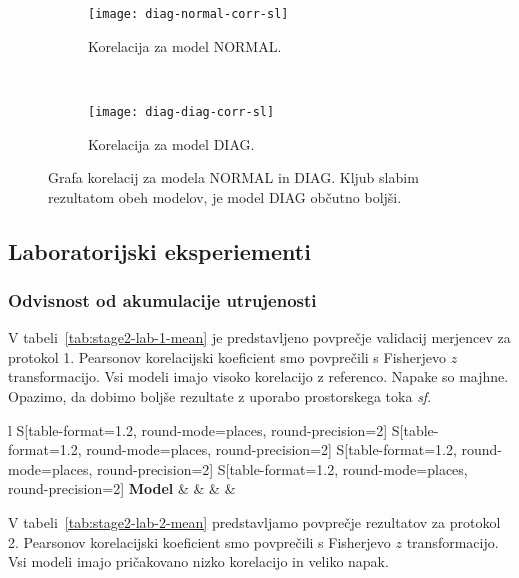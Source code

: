 \begin{figure}[!htb]
	\centering
	\begin{subfigure}[t]{0.45\columnwidth}
		\texttt{[image: diag-normal-corr-sl]}
		\caption{Korelacija za model NORMAL.}
		\label{fig:corr-diag-normal}
	\end{subfigure}
	~
	\begin{subfigure}[t]{0.45\columnwidth}
		\texttt{[image: diag-diag-corr-sl]}
		\caption{Korelacija za model DIAG.}
		\label{fig:corr-diag-diag}
	\end{subfigure}
	\caption[]{Grafa korelacij za modela NORMAL in DIAG. Kljub slabim rezultatom obeh modelov, je model DIAG občutno boljši.}
	\label{fig:corr-diag}
\end{figure}


\subsection{Laboratorijski eksperiementi}
\subsubsection{Odvisnost od akumulacije utrujenosti}
V tabeli~\ref{tab:stage2-lab-1-mean} je predstavljeno povprečje validacij merjencev za protokol 1. Pearsonov korelacijski koeficient \corr smo povprečili s Fisherjevo $z$ transformacijo. Vsi modeli imajo visoko korelacijo z referenco. Napake so majhne. Opazimo, da dobimo boljše rezultate z uporabo prostorskega toka \textit{sf}.

\begin{table}[!htbp]
	\centering
	\begin{tabular}{l S[table-format=1.2, round-mode=places, round-precision=2] S[table-format=1.2, round-mode=places, round-precision=2] S[table-format=1.2, round-mode=places, round-precision=2] S[table-format=1.2, round-mode=places, round-precision=2]}
		\toprule
		\textbf{Model} & \thead{\corr} & \thead{\rae} & \thead{\rrse} & \theadm{\nsv}\\
		\midrule
		\bottomrule
	\end{tabular}
	\caption[Povprečje validacij merjencev za protokol 1 2. faze lab. eksperimentov]{Povprečje validacij merjencev za protokol 1 druge faze laboratorijskih eksperimentov. \corr smo povprečili s Fisherjevo $z$ transformacijo.}
	\label{tab:stage2-lab-1-mean}
\end{table}

V tabeli~\ref{tab:stage2-lab-2-mean}  predstavljamo povprečje rezultatov za protokol 2. Pearsonov korelacijski koeficient \corr smo povprečili s Fisherjevo $z$ transformacijo. Vsi modeli imajo pričakovano nizko korelacijo in veliko napak.

